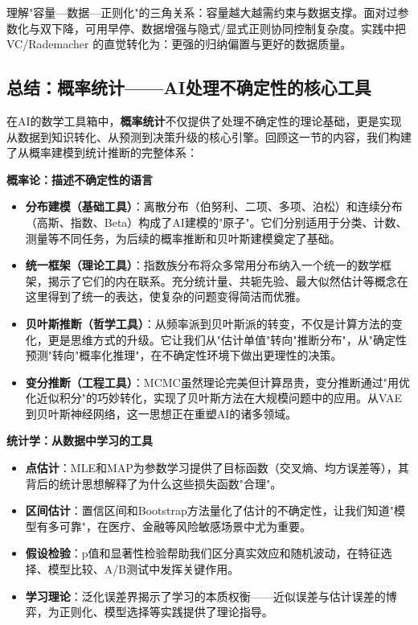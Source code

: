 理解"容量—数据—正则化"的三角关系：容量越大越需约束与数据支撑。面对过参数化与双下降，可用早停、数据增强与隐式/显式正则协同控制复杂度。实践中把 VC/Rademacher 的直觉转化为：更强的归纳偏置与更好的数据质量。

\subsection{总结：概率统计——AI处理不确定性的核心工具}

在AI的数学工具箱中，\textbf{概率统计}不仅提供了处理不确定性的理论基础，更是实现从数据到知识转化、从预测到决策升级的核心引擎。回顾这一节的内容，我们构建了从概率建模到统计推断的完整体系：

\textbf{概率论：描述不确定性的语言}
\begin{itemize}
    \item \textbf{分布建模（基础工具）}：离散分布（伯努利、二项、多项、泊松）和连续分布（高斯、指数、Beta）构成了AI建模的"原子"。它们分别适用于分类、计数、测量等不同任务，为后续的概率推断和贝叶斯建模奠定了基础。

    \item \textbf{统一框架（理论工具）}：指数族分布将众多常用分布纳入一个统一的数学框架，揭示了它们的内在联系。充分统计量、共轭先验、最大似然估计等概念在这里得到了统一的表达，使复杂的问题变得简洁而优雅。

    \item \textbf{贝叶斯推断（哲学工具）}：从频率派到贝叶斯派的转变，不仅是计算方法的变化，更是思维方式的升级。它让我们从"估计单值"转向"推断分布"，从"确定性预测"转向"概率化推理"，在不确定性环境下做出更理性的决策。

    \item \textbf{变分推断（工程工具）}：MCMC虽然理论完美但计算昂贵，变分推断通过"用优化近似积分"的巧妙转化，实现了贝叶斯方法在大规模问题中的应用。从VAE到贝叶斯神经网络，这一思想正在重塑AI的诸多领域。
\end{itemize}

\textbf{统计学：从数据中学习的工具}
\begin{itemize}
    \item \textbf{点估计}：MLE和MAP为参数学习提供了目标函数（交叉熵、均方误差等），其背后的统计思想解释了为什么这些损失函数"合理"。

    \item \textbf{区间估计}：置信区间和Bootstrap方法量化了估计的不确定性，让我们知道"模型有多可靠"，在医疗、金融等风险敏感场景中尤为重要。

    \item \textbf{假设检验}：p值和显著性检验帮助我们区分真实效应和随机波动，在特征选择、模型比较、A/B测试中发挥关键作用。

    \item \textbf{学习理论}：泛化误差界揭示了学习的本质权衡——近似误差与估计误差的博弈，为正则化、模型选择等实践提供了理论指导。
\end{itemize}

